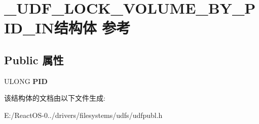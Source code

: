 \hypertarget{struct___u_d_f___l_o_c_k___v_o_l_u_m_e___b_y___p_i_d___i_n}{}\section{\+\_\+\+U\+D\+F\+\_\+\+L\+O\+C\+K\+\_\+\+V\+O\+L\+U\+M\+E\+\_\+\+B\+Y\+\_\+\+P\+I\+D\+\_\+\+I\+N结构体 参考}
\label{struct___u_d_f___l_o_c_k___v_o_l_u_m_e___b_y___p_i_d___i_n}
\subsection*{Public 属性}
\begin{DoxyCompactItemize}
\item 
\mbox{\label{struct___u_d_f___l_o_c_k___v_o_l_u_m_e___b_y___p_i_d___i_n_a176845e2e24340b7ab5d1800f3ed9166}} 
U\+L\+O\+NG {\bfseries P\+ID}
\end{DoxyCompactItemize}


该结构体的文档由以下文件生成\+:\begin{DoxyCompactItemize}
\item 
E\+:/\+React\+O\+S-\/0../drivers/filesystems/udfs/udfpubl.\+h\end{DoxyCompactItemize}
